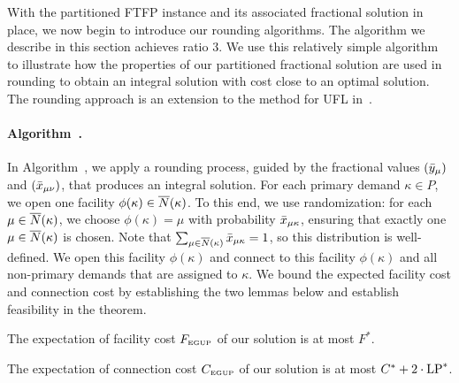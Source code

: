 \documentclass[11pt]{article}
\begin{document}
With the partitioned FTFP instance and its associated fractional
solution in place, we now begin to introduce our rounding algorithms.
The algorithm we describe in this section achieves ratio $3$. We use
this relatively simple algorithm to illustrate how the properties of
our partitioned fractional solution are used in rounding to obtain an
integral solution with cost close to an optimal solution. The rounding
approach is an extension to the method for UFL in~\cite{gupta08}.

\paragraph{Algorithm~{\EGUP.}}
In Algorithm~{\EGUP}, we apply a rounding process, guided by the
fractional values $({\bar y}_{\mu})$ and $({\bar x}_{\mu\nu})$, that
produces an integral solution.  For each primary demand $\kappa\in P$,
we open one facility $\phi(\kappa) \in {\overline{N}}(\kappa)$. To this end,
we use randomization: for each $\mu\in{\overline{N}}(\kappa)$, we choose
$\phi(\kappa) = \mu$ with probability ${\bar x}_{\mu\kappa}$, ensuring
that exactly one $\mu \in {\overline{N}}(\kappa)$ is chosen. Note that
$\sum_{\mu\in{\overline{N}}(\kappa)}{\bar x}_{\mu\kappa}=1$, so this distribution
is well-defined.  We open this facility $\phi(\kappa)$ and connect to
this facility $\phi(\kappa)$ and all non-primary demands that are
assigned to $\kappa$.
We bound the expected facility cost and connection cost by
establishing the two lemmas below and establish feasibility in the
theorem.
\begin{lemma}\label{lemma:3fac}
The expectation of facility cost $F_{\mbox{\tiny\rm EGUP}}$ of our solution is
  at most $F^\ast$.
\end{lemma}
\begin{lemma}\label{lemma:3dist}
The expectation of connection cost $C_{\mbox{\tiny\rm EGUP}}$ of our solution
is at most  $C^\ast+2\cdot\mbox{\rm LP}^\ast$.
\end{lemma}
\end{document}
